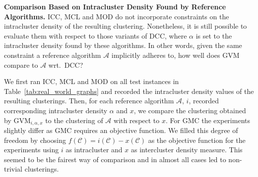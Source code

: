 \documentclass{llncs}
\newcommand{\C}{\ensuremath{\mathcal{C}}}
\newcommand{\andreapar}{\vspace*{.5ex}\par\noindent}
\begin{document}
\vspace*{-0.5ex}
\andreapar\textbf{Comparison Based on Intracluster Density Found by Reference Algorithms.}
ICC, MCL and MOD do not incorporate constraints on the intracluster density of the resulting clustering.
Nonetheless, it is still possible to evaluate them with respect to those variants of DCC, where $\alpha$ is set to the intracluster density found by these algorithms.
In other words, given the same constraint a reference algorithm $\mathcal{A}$ implicitly adheres to, how well does GVM compare to $\mathcal{A}$ wrt.~DCC?
\par
We first ran ICC, MCL and MOD on all test instances in Table~\ref{tab:real_world_graphs} and recorded the intracluster density values of the resulting clusterings. 
Then, for each reference algorithm $\mathcal{A}$, $i$, recorded corresponding intracluster density $\alpha$ and $x$, we compare the clustering obtained by $\text{GVM}_{i, \alpha, x}$ to the clustering of $\mathcal{A}$ with respect to $x$. 
For GMC the experiments slightly differ as GMC requires an objective function.
We filled this degree of freedom by choosing $f(\C)=i(\C)-x(\C)$ as the objective function for the experiments using $i$ as intracluster and $x$ as intercluster density measure.
This seemed to be the fairest way of comparison and in almost all cases led to non-trivial clusterings.
\par
\end{document}
